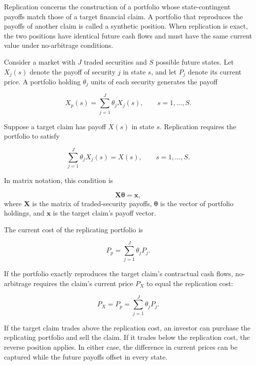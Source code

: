 Replication concerns the construction of a portfolio
whose state-contingent payoffs match those of a target
financial claim. A portfolio that reproduces the
payoffs of another claim is called a
synthetic position. When replication is exact,
the two positions have identical future cash flows
and must have the same current value under
no-arbitrage conditions.

Consider a market with $J$ traded securities and
$S$ possible future states. Let $X_j(s)$ denote the
payoff of security $j$ in state $s$, and let $P_j$
denote its current price. A portfolio holding
$\theta_j$ units of each security generates the
payoff

\begin{equation}
X_p(s)
=
\sum_{j=1}^{J}\theta_j X_j(s),
\qquad s=1,\ldots,S.
\label{eq:ch11-replicating-portfolio-payoff}
\end{equation}

Suppose a target claim has payoff $X(s)$ in state
$s$. Replication requires the portfolio to satisfy

\begin{equation}
\sum_{j=1}^{J}\theta_j X_j(s)
=
X(s),
\qquad s=1,\ldots,S.
\label{eq:ch11-replication-conditions}
\end{equation}

In matrix notation, this condition is

\begin{equation}
\mathbf{X}\boldsymbol{\theta}
=
\mathbf{x},
\label{eq:ch11-replication-matrix}
\end{equation}
where $\mathbf{X}$ is the matrix of traded-security
payoffs, $\boldsymbol{\theta}$ is the vector of
portfolio holdings, and $\mathbf{x}$ is the target
claim's payoff vector.

The current cost of the replicating portfolio is

\begin{equation}
P_p
=
\sum_{j=1}^{J}\theta_j P_j.
\label{eq:ch11-replicating-portfolio-cost}
\end{equation}

If the portfolio exactly reproduces the target
claim's contractual cash flows, no-arbitrage
requires the claim's current price $P_X$ to equal the
replication cost:

\begin{equation}
P_X=P_p
=
\sum_{j=1}^{J}\theta_j P_j.
\label{eq:ch11-replication-pricing}
\end{equation}

If the target claim trades above the replication
cost, an investor can purchase the replicating
portfolio and sell the claim. If it trades below
the replication cost, the reverse position applies.
In either case, the difference in current prices
can be captured while the future payoffs offset
in every state.

